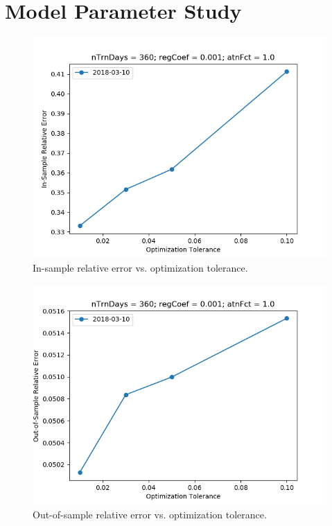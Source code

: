 \documentclass{article}
\begin{document}
\section{Model Parameter Study}\label{section:model-parameter-study}

\begin{figure}\label{fig:tolerance-sensitivity-error}
\includegraphics[bb=0 0 640 480]{figures/tolerance-sensitivity-error.png}
\caption{In-sample relative error vs. optimization tolerance.}
\end{figure}

\begin{figure}\label{fig:tolerance-sensitivity-oos-error}
\includegraphics[bb=0 0 640 480]{figures/tolerance-sensitivity-oos-error.png}
\caption{Out-of-sample relative error vs. optimization tolerance.}
\end{figure}
\end{document}
